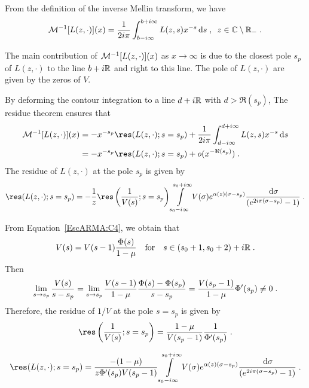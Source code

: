 From the definition of the inverse Mellin transform, we have
\begin{equation}
    \mathcal{M}^{-1}[L(z,\cdot)](x) = \frac{1}{2i\pi} \int_{b-i\infty}^{b+i\infty} L(z,s)x^{-s}\,\mathrm{d} s
    \; , \enspace
    z \in \mathbb{C} \setminus \mathbb{R}_-
    \; .
\end{equation}

The main contribution of $\mathcal{M}^{-1}[L(z,\cdot)](x)$ as $x \to \infty$ is due to the closest pole $s_p$ of $L(z,\cdot)$ to the line $b+i\mathbb{R}$ and right to this line. The pole of $L(z,\cdot)$ are given by the zeros of $V$. 

By deforming the contour integration to a line $d+i\mathbb{R}$ with $d > \Re(s_p)$, The residue theorem ensures that
\begin{subequations}
\begin{align}
    \Mcal^{-1}[L(z,\cdot)](x) 
    &= - x^{-s_p}\res(L(z,\cdot);s = s_p) +  \frac{1}{2i\pi} \int_{d-i\infty}^{d+i\infty} L(z,s)x^{-s}\diff s\\
    &= - x^{-s_p}\res(L(z,\cdot);s = s_p) + o(x^{-\Re(s_p)})
    \eqfinp
\end{align}
\label{eq:exprMellinInv}
\end{subequations}
The residue of $L(z,\cdot)$ at the pole $s_p$ is given by 
\begin{equation*}
    \res(L(z,\cdot);s = s_p) 
    = 
    - \frac{1}{z}\res\left( \frac{1}{V(s)}; s = s_p\right) \int\limits_{s_0-i\infty}^{s_0+i\infty}
    V(\sigma) e^{ \alpha(z)(\sigma-s_p)}
   \frac{\diff \sigma}{(e^{2i\pi(\sigma-s_p)}-1)}
   \eqfinp
\end{equation*}

From Equation~\eqref{EscARMA:C4}, we obtain that
$$ V(s) = V(s-1)\frac{\Phi(s)}{1-\mu}
        \quad \text{for} \quad
        s \in (s_0+1, s_0+2) + i\mathbb{R}
        \; .$$
Then 
$$ \lim_{s\to s_p} \frac{V(s)}{s-s_p} 
= \lim_{s\to s_p} \frac{V(s-1)}{1-\mu} \frac{\Phi(s)-\Phi(s_p)}{s-s_p}
=  \frac{V(s_p-1)}{1-\mu} \Phi'(s_p) \neq 0 \; .$$
Therefore, the  residue of $1/V$ at the pole $s = s_p$ is given by 
$$ \res\left( \frac{1}{V(s)}; s = s_p\right) = \frac{1-\mu}{V(s_p-1)} \frac{1}{\Phi'(s_p)} \eqfinp$$

\begin{equation}
    \res(L(z,\cdot);s = s_p) 
    = 
     \frac{-(1-\mu)}{z \Phi'(s_p) V(s_p-1)}
     \int\limits_{s_0-i\infty}^{s_0+i\infty}
    V(\sigma) e^{ \alpha(z)(\sigma-s_p)}
   \frac{\diff \sigma}{(e^{2i\pi(\sigma-s_p)}-1)}
   \eqfinp
\end{equation}

